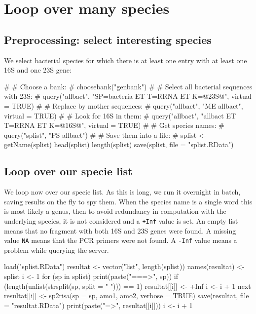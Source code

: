 \documentclass{article}
\begin{document}
\section{Loop over many species}

\subsection{Preprocessing: select interesting species}

We select bacterial species for which there is at least one
entry with at least one 16S and one 23S gene:

\begin{Schunk}
\begin{Sinput}
 #
 # Choose a bank:
 #
 choosebank("genbank")
 #
 # Select all bacterial sequences with 23S:
 #
 query("allbact", "SP=bacteria ET T=RRNA ET K=@23S@", virtual = TRUE)
 #
 # Replace by mother sequences:
 #
 query("allbact", "ME allbact", virtual = TRUE)
 #
 # Look for 16S in them:
 #
 query("allbact", "allbact ET T=RRNA ET K=@16S@", virtual = TRUE)
 #
 # Get species names:
 #
 query("splist", "PS allbact")
 #
 # Save them into a file:
 #
 splist <- getName(splist)
 head(splist)
 length(splist)
 save(splist, file = "splist.RData")
\end{Sinput}
\end{Schunk}

\subsection{Loop over our specie list}

We loop now over our specie list. As this is long, we run
it overnight in batch, saving results on the fly to spy them.
When the species name is a single word this is most likely a genus,
then to avoid redundancy in computation with the underlying species,
it is not considered and a \texttt{+Inf} value is set. An empty list
means that no fragment with both 16S and 23S genes were found. A
missing value \texttt{NA} means that the PCR primers were not found.
A \texttt{-Inf} value means a problem while querying the server.

\begin{Schunk}
\begin{Sinput}
 load("splist.RData")
 resultat <- vector("list", length(splist))
 names(resultat) <- splist
 i <- 1
 for (sp in splist) {
     print(paste("===>", sp))
     if (length(unlist(strsplit(sp, split = " "))) == 1) {
         resultat[[i]] <- +Inf
         i <- i + 1
         next
     }
     resultat[[i]] <- sp2risa(sp = sp, amo1, amo2, verbose = TRUE)
     save(resultat, file = "resultat.RData")
     print(paste("=>", resultat[[i]]))
     i <- i + 1
 }
\end{Sinput}
\end{Schunk}
\end{document}
